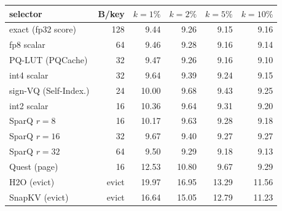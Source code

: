 \begin{tabular}{l r r r r r}
\toprule
selector & B/key & $k{=}1\%$ & $k{=}2\%$ & $k{=}5\%$ & $k{=}10\%$ \\
\midrule
exact (fp32 score) & 128 & 9.44 & 9.26 & 9.15 & 9.16 \\
fp8 scalar & 64 & 9.46 & 9.28 & 9.16 & 9.14 \\
PQ-LUT (PQCache) & 32 & 9.47 & 9.26 & 9.16 & 9.10 \\
int4 scalar & 32 & 9.64 & 9.39 & 9.24 & 9.15 \\
sign-VQ (Self-Index.) & 24 & 10.00 & 9.68 & 9.43 & 9.25 \\
int2 scalar & 16 & 10.36 & 9.64 & 9.31 & 9.20 \\
SparQ $r{=}8$ & 16 & 10.17 & 9.63 & 9.28 & 9.18 \\
SparQ $r{=}16$ & 32 & 9.67 & 9.40 & 9.27 & 9.27 \\
SparQ $r{=}32$ & 64 & 9.50 & 9.29 & 9.18 & 9.13 \\
Quest (page) & 16 & 12.53 & 10.80 & 9.67 & 9.29 \\
H2O (evict) & evict & 19.97 & 16.95 & 13.29 & 11.56 \\
SnapKV (evict) & evict & 16.64 & 15.05 & 12.79 & 11.23 \\
\bottomrule
\end{tabular}
